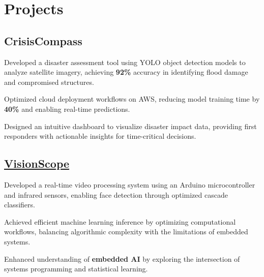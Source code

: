 \documentclass[]{farhan-resume-openfont}
\begin{document}
\begin{minipage}[t]{0.70\textwidth}
    \section{Projects}
    \subsection{{CrisisCompass}}
    \begin{tightemize}
        \vspace{10pt}
        \item Developed a disaster assessment tool using YOLO object detection
            models to analyze satellite imagery, achieving \textbf{92\%} accuracy in
        identifying flood damage and compromised structures.
        \item Optimized cloud deployment workflows on AWS, reducing model training
        time by \textbf{40\%} and enabling real-time predictions.
        \item Designed an intuitive dashboard to visualize disaster impact data,
        providing first responders with actionable insights for time-critical
        decisions.
    \end{tightemize}
    \sectionsep

    \subsection{\href{https://arduino.cc/}{VisionScope}}
    \begin{tightemize}
        \vspace{10pt}
        \item Developed a real-time video processing system using an Arduino
        microcontroller and infrared sensors, enabling face detection through optimized
        cascade classifiers.
        \item Achieved efficient machine learning inference by optimizing
            computational workflows, balancing algorithmic complexity with the limitations
        of embedded systems.
        \item Enhanced understanding of \textbf{embedded AI} by exploring the intersection of
        systems programming and statistical learning.
    \end{tightemize}
    \sectionsep


\end{minipage}
\end{document}

